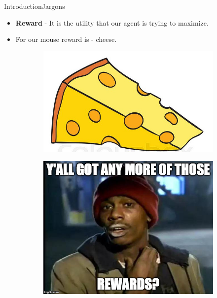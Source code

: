 \documentclass[10pt]{beamer}
\begin{document}
\begin{frame}{Introduction}{Jargons}

\begin{itemize}
\item \textbf{Reward} - It is the utility that our agent is trying to maximize.
\item For our mouse reward is - cheese.
\end{itemize}

\begin{figure}[!htb]
\centering
\begin{subfigure}[t]{0.4\linewidth}
\includegraphics[width=1\textwidth]{assets/cheese.jpg}
\end{subfigure}
\centering
\begin{subfigure}[t]{0.4\linewidth}
\includegraphics[width=.6\textwidth]{assets/meme_rewards.jpg}
\end{subfigure}

\vspace{0.1in}
\label{fig:tripEmb}
\end{figure}

\end{frame}
\end{document}
